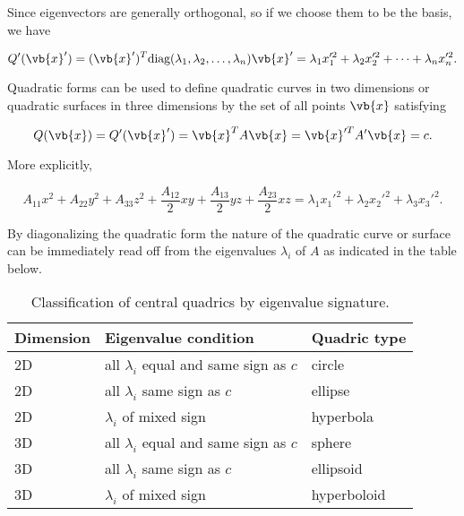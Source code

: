 \documentclass[a4paper,12pt]{report}
\begin{document}
Since eigenvectors are generally orthogonal, so if we choose them to be the basis, we have 

\begin{equation}
    Q'(\vb{x} ') = (\vb{x}') ^T\text{diag}(\lambda _{1},\lambda _{2}, \ldots ,\lambda _{n}   )\vb{x} ' = \lambda _{1}x'^2_1+ \lambda _{2}x'^2_2  + \cdots + \lambda _{n}x'^2_{n} .    
\end{equation}

Quadratic forms can be used to define quadratic curves in two dimensions or quadratic surfaces in three dimensions by the set of all points \(\vb{x} \) satisfying 

\begin{equation}
    Q(\vb{x} ) = Q'(\vb{x} ') = \vb{x} ^TA\vb{x} = \vb{x} '^T A'\vb{x} = c.
\end{equation}

More explicitly, 

\begin{equation}
    A_{11}x^2+A_{22}y^2+A_{33}z^2+\frac{A_{12} }{2}xy+\frac{A_{13} }{2}yz+\frac{A_{23} }{2}xz=\lambda _{1}x_1 '^2+\lambda _{2}x_2 '^2+\lambda _{3}x_3 '^2.        
\end{equation}

By diagonalizing the quadratic form the nature of the quadratic curve or surface can be immediately read off from the eigenvalues \(\lambda _{i} \) of \(A\) as indicated in the table below. 

\begin{table}[h]
\centering
\begin{tabular}{lll}
\toprule
\textbf{Dimension} & \textbf{Eigenvalue condition} & \textbf{Quadric type} \\
\midrule
2D & all $\lambda_i$ equal and same sign as $c$ & circle    \\
2D & all $\lambda_i$ same sign as $c$           & ellipse   \\
2D & $\lambda_i$ of mixed sign                   & hyperbola \\
\midrule
3D & all $\lambda_i$ equal and same sign as $c$ & sphere     \\
3D & all $\lambda_i$ same sign as $c$           & ellipsoid  \\
3D & $\lambda_i$ of mixed sign                   & hyperboloid\\
\bottomrule
\end{tabular}
\caption{Classification of central quadrics by eigenvalue signature.}
\label{tab:quadric-classification}
\end{table}
\end{document}
